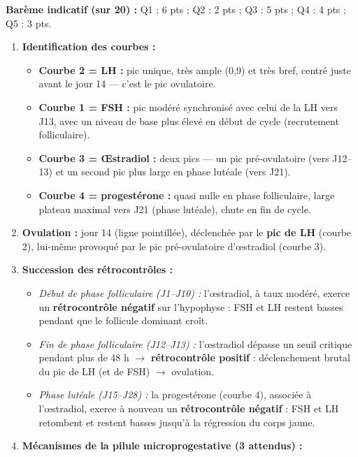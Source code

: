 \documentclass[11pt]{article}
\begin{document}
\begin{corrige}
\textbf{Barème indicatif (sur 20) :} Q1 : 6 pts ; Q2 : 2 pts ; Q3 : 5 pts ; Q4 : 4 pts ; Q5 : 3 pts.
\begin{enumerate}
    \item \textbf{Identification des courbes :}
    \begin{itemize}
        \item \textbf{Courbe 2 = LH :} pic unique, très ample (0,9) et très bref, centré juste avant le jour 14 — c'est le pic ovulatoire.
        \item \textbf{Courbe 1 = FSH :} pic modéré synchronisé avec celui de la LH vers J13, avec un niveau de base plus élevé en début de cycle (recrutement folliculaire).
        \item \textbf{Courbe 3 = Œstradiol :} deux pics — un pic pré-ovulatoire (vers J12--13) et un second pic plus large en phase lutéale (vers J21).
        \item \textbf{Courbe 4 = progestérone :} quasi nulle en phase folliculaire, large plateau maximal vers J21 (phase lutéale), chute en fin de cycle.
    \end{itemize}
    \item \textbf{Ovulation :} jour 14 (ligne pointillée), déclenchée par le \textbf{pic de LH} (courbe 2), lui-même provoqué par le pic pré-ovulatoire d'œstradiol (courbe 3).
    \item \textbf{Succession des rétrocontrôles :}
    \begin{itemize}
        \item \emph{Début de phase folliculaire (J1--J10) :} l'œstradiol, à taux modéré, exerce un \textbf{rétrocontrôle négatif} sur l'hypophyse : FSH et LH restent basses pendant que le follicule dominant croît.
        \item \emph{Fin de phase folliculaire (J12--J13) :} l'œstradiol dépasse un seuil critique pendant plus de 48 h $\rightarrow$ \textbf{rétrocontrôle positif} : déclenchement brutal du pic de LH (et de FSH) $\rightarrow$ ovulation.
        \item \emph{Phase lutéale (J15--J28) :} la progestérone (courbe 4), associée à l'œstradiol, exerce à nouveau un \textbf{rétrocontrôle négatif} : FSH et LH retombent et restent basses jusqu'à la régression du corps jaune.
    \end{itemize}
    \item \textbf{Mécanismes de la pilule microprogestative (3 attendus) :}

\end{enumerate}
\end{corrige}
\end{document}
